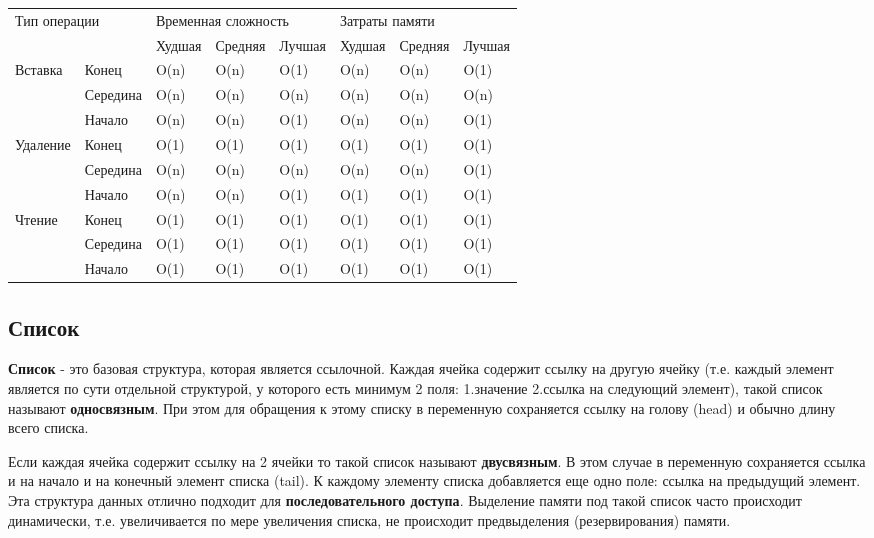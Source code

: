 \begin{table}[h!]
\label{time:arr}
\begin{tabular}{|l|l|l|l|l|l|l|l|}
\hline
\multicolumn{2}{|l|}{\multirow{2}{*}{Тип операции}} & \multicolumn{3}{l|}{Временная сложность} & \multicolumn{3}{l|}{Затраты памяти} \\ \cline{3-8} 
\multicolumn{2}{|l|}{}                  & Худшая & Средняя & Лучшая & Худшая & Средняя & Лучшая		\\ \hline
\multirow{3}{*}{Вставка}     & Конец 	& O(n) 	 & O(n)    & O(1)   & O(n)   & O(n)    & O(1)		\\ \cline{2-8} 
             & Середина & O(n) 	 & O(n)    & O(n)   & O(n)   & O(n)    & O(n)		\\ \cline{2-8} 
             & Начало 	& O(n) 	 & O(n)    & O(1)   & O(n)   & O(n)    & O(1)		\\ \hline
\multirow{3}{*}{Удаление}    & Конец 	& O(1) 	 & O(1)    & O(1)   & O(1)   & O(1)    & O(1)		\\ \cline{2-8} 
             & Середина & O(n) 	 & O(n)    & O(n)   & O(n)   & O(n)    & O(1)		\\ \cline{2-8} 
             & Начало 	& O(n) 	 & O(n)    & O(1)   & O(1)   & O(1)    & O(1)		\\ \hline
\multirow{3}{*}{Чтение}      & Конец 	& O(1) 	 & O(1)    & O(1)   & O(1)   & O(1)    & O(1)		\\ \cline{2-8} 
             & Середина & O(1) 	 & O(1)    & O(1)   & O(1)   & O(1)    & O(1)		\\ \cline{2-8} 
             & Начало 	& O(1) 	 & O(1)    & O(1)   & O(1)   & O(1)    & O(1)		\\ \hline
			
\end{tabular}
\end{table}

\subsection{Список}
\textbf{Список} - это базовая структура, которая является ссылочной. Каждая ячейка содержит ссылку на другую ячейку (т.е. каждый элемент является по сути отдельной структурой, у которого есть минимум 2 поля: 1.значение 2.ссылка на следующий элемент), такой список называют \textbf{односвязным}. При этом для обращения к этому списку в переменную сохраняется ссылку на голову (head) и обычно длину всего списка.

Если каждая ячейка содержит ссылку на 2 ячейки то такой список называют \textbf{двусвязным}. В этом случае в переменную сохраняется ссылка и на начало и на конечный элемент списка (tail). К каждому элементу списка добавляется еще одно поле: ссылка на предыдущий элемент. Эта структура данных отлично подходит для \textbf{последовательного доступа}.
Выделение памяти под такой список часто происходит динамически, т.е. увеличивается по мере увеличения списка, не происходит предвыделения (резервирования) памяти.
